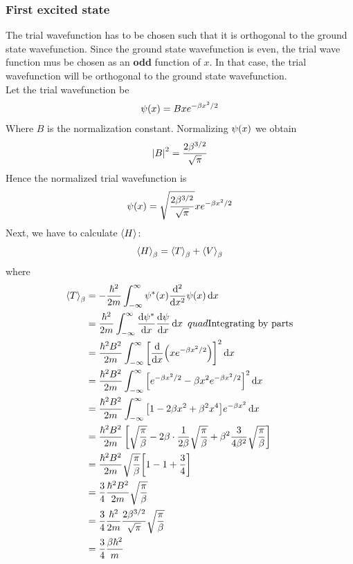 	
	\subsubsection{First excited state}
	
	The trial wavefunction has to be chosen such that it is orthogonal to the ground state wavefunction. Since the ground state wavefunction is even, the trial wave function mus be chosen as an \textbf{odd} function of $x$. In that case, the trial wavefunction will be orthogonal to the ground state wavefunction.\\
	
	Let the trial wavefunction be
	\begin{align}
		\psi\qty(x) = B x e^{-\beta x^2/2}
	\end{align}
	Where $B$ is the normalization constant. Normalizing $\psi\qty(x)$ we obtain
	\begin{align}
		\abs{B}^2 = \frac{2 \beta^{3/2}}{\sqrt{\pi}}
	\end{align}
	Hence the normalized trial wavefunction is
	\begin{align}
		\psi\qty(x) = \sqrt{\frac{2 \beta^{3/2}}{\sqrt{\pi}}} x e^{-\beta x^2/2}
	\end{align}
	Next, we have to calculate $\expval{H}$:
	\begin{align}
		\expval{H}_\beta = \expval{T}_\beta + \expval{V}_\beta
	\end{align}
	where
	\begin{align*}
		\expval{T}_\beta 
		&= - \frac{\hbar^2}{2 m} \int_{-\infty}^{\infty} \psi^*\qty(x) \dv[2]{}{x} \psi\qty(x) \dd{x}\\
		&= \frac{\hbar^2}{2 m} \int_{-\infty}^{\infty} \dv{\psi^*}{x} \dv{\psi}{x} \dd{x} \ quad \text{Integrating by parts}\\
		&= \frac{\hbar^2 B^2}{2 m} \int_{-\infty}^{\infty} \qty[\dv{}{x} \qty(x e^{-\beta x^2/2})]^2 \dd{x}\\
		&= \frac{\hbar^2 B^2}{2 m} \int_{-\infty}^{\infty} \qty[e^{-\beta x^2/2} - \beta x^2 e^{-\beta x^2/2}]^2 \dd{x} \\
		&= 	\frac{\hbar^2 B^2}{2 m} \int_{-\infty}^{\infty} \qty[1 - 2\beta x^2 + \beta^2 x^4] e^{-\beta x^2} \dd{x} \\
		&= \frac{\hbar^2 B^2}{2 m} \left[
		\sqrt{\frac{\pi}{\beta}} - 2 \beta \cdot \frac{1}{2\beta} \sqrt{\frac{\pi}{\beta}}  + \beta^2 \frac{3}{4 \beta^2} \sqrt{\frac{\pi}{\beta}} 
		\right] \\
		&= \frac{\hbar^2 B^2}{2 m} \sqrt{\frac{\pi}{\beta}} \qty[1 - 1 + \frac{3}{4}] \\
		&= \frac{3}{4} \frac{\hbar^2 B^2}{2 m} \sqrt{\frac{\pi}{\beta}} \\
		&= \frac{3}{4} \frac{\hbar^2}{2 m} \frac{2 \beta^{3/2}}{\sqrt{\pi}}  \sqrt{\frac{\pi}{\beta}} \\
		&= \frac{3}{4} \frac{\beta \hbar^2}{m}
	\end{align*}
